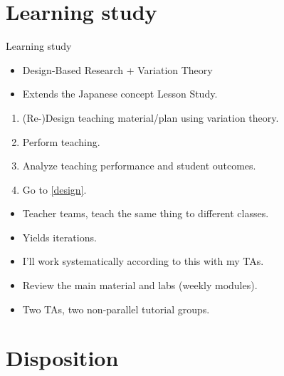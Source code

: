\section{Learning study}

\begin{frame}
  \begin{block}{Learning study~\cite{LearningStudy}}
    \begin{itemize}
      \item Design-Based Research + Variation Theory
      \item Extends the Japanese concept Lesson Study.
    \end{itemize}
    \pause
    \begin{enumerate}
      \item \label{design} (Re-)Design teaching material/plan using variation 
        theory.
      \item Perform teaching.
      \item Analyze teaching performance and student outcomes.
      \item Go to \ref{design}.
    \end{enumerate}
  \end{block}

  \pause

  \begin{remark}
    \begin{itemize}
      \item Teacher teams, teach the same thing to different classes.
      \item Yields iterations.
    \end{itemize}
  \end{remark}
\end{frame}

\begin{frame}
  \begin{example}
    \begin{itemize}
      \item I'll work systematically according to this with my TAs.
      \item Review the main material and labs (weekly modules).
      \item Two TAs, two non-parallel tutorial groups.
    \end{itemize}
  \end{example}
\end{frame}

\section{Disposition}

